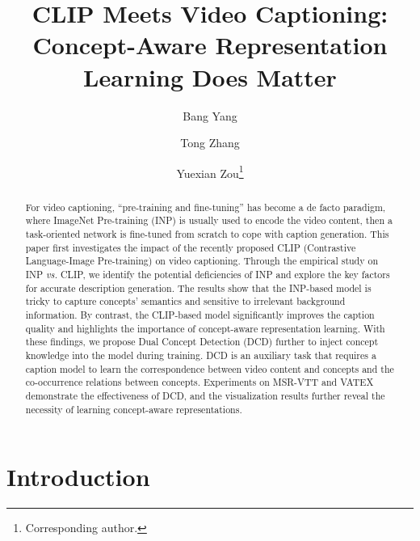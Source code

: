 \documentclass[runningheads]{llncs}
\newcommand\vs{\textit{vs.}}
\begin{document}
\title{CLIP Meets Video Captioning: Concept-Aware Representation Learning Does Matter}



\author{}
\authorrunning{}
\institute{}

\author{Bang Yang \and
Tong Zhang \and
Yuexian Zou\thanks{Corresponding author.}}


\maketitle              \begin{abstract}
For video captioning, ``pre-training and fine-tuning'' has become a de facto paradigm, where ImageNet Pre-training (INP) is usually used to encode the video content, then a task-oriented network is fine-tuned from scratch to cope with caption generation. This paper first investigates the impact of the recently proposed CLIP (Contrastive Language-Image Pre-training) on video captioning. Through the empirical study on INP \vs{} CLIP, we identify the potential deficiencies of INP and explore the key factors for accurate description generation. The results show that the INP-based model is tricky to capture concepts' semantics and sensitive to irrelevant background information. By contrast, the CLIP-based model significantly improves the caption quality and highlights the importance of concept-aware representation learning. With these findings, we propose Dual Concept Detection (DCD) further to inject concept knowledge into the model during training. DCD is an auxiliary task that requires a caption model to learn the correspondence between video content and concepts and the co-occurrence relations between concepts. Experiments on MSR-VTT and VATEX demonstrate the effectiveness of DCD, and the visualization results further reveal the necessity of learning concept-aware representations.
\end{abstract}
\section{Introduction}
\label{sec:introduction}
\end{document}
